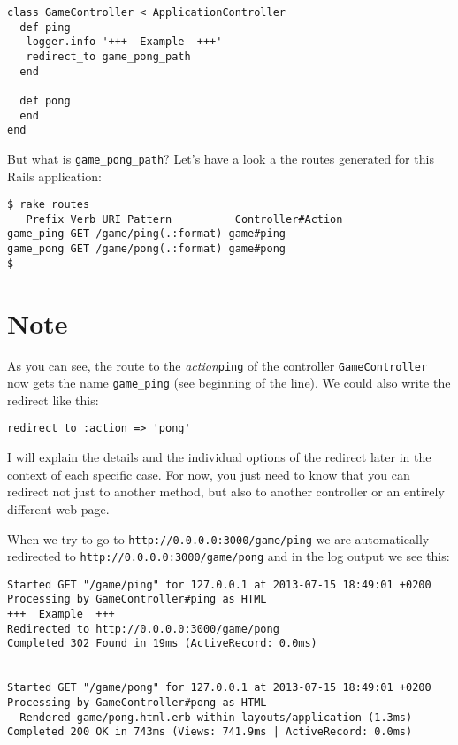 \documentclass[a4paper]{book}
\begin{document}
\begin{shaded}\begin{verbatim}
class GameController < ApplicationController
  def ping
   logger.info '+++  Example  +++'
   redirect_to game_pong_path
  end

  def pong
  end
end
\end{verbatim}\end{shaded}

But what is \texttt{game\_pong\_path}? Let's have a look a the routes generated for this Rails application:

\begin{shaded}\begin{verbatim}
$ rake routes
   Prefix Verb URI Pattern          Controller#Action
game_ping GET /game/ping(.:format) game#ping
game_pong GET /game/pong(.:format) game#pong
$
\end{verbatim}\end{shaded}

\section{Note}\label{note-19}

As you can see, the route to the \emph{action}\texttt{ping} of the controller \texttt{GameController} now gets the name \texttt{game\_ping} (see beginning of the line). We could also write the redirect like this:

\begin{shaded}\begin{verbatim}
redirect_to :action => 'pong'
\end{verbatim}\end{shaded}

I will explain the details and the individual options of the redirect later in the context of each specific case. For now, you just need to know that you can redirect not just to another method, but also to another controller or an entirely different web page.

When we try to go to \texttt{http://0.0.0.0:3000/game/ping} we are automatically redirected to \texttt{http://0.0.0.0:3000/game/pong} and in the log output we see this:

\begin{shaded}\begin{verbatim}
Started GET "/game/ping" for 127.0.0.1 at 2013-07-15 18:49:01 +0200
Processing by GameController#ping as HTML
+++  Example  +++
Redirected to http://0.0.0.0:3000/game/pong
Completed 302 Found in 19ms (ActiveRecord: 0.0ms)


Started GET "/game/pong" for 127.0.0.1 at 2013-07-15 18:49:01 +0200
Processing by GameController#pong as HTML
  Rendered game/pong.html.erb within layouts/application (1.3ms)
Completed 200 OK in 743ms (Views: 741.9ms | ActiveRecord: 0.0ms)
\end{verbatim}\end{shaded}
\end{document}
